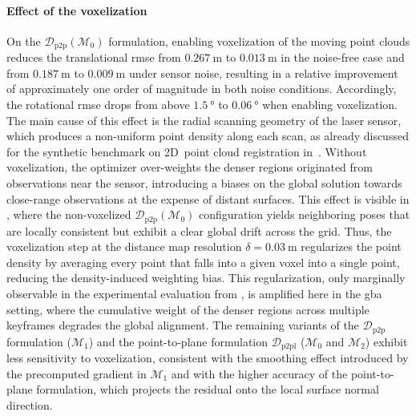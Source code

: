 \paragraph{Effect of the voxelization}
On the $\mathcal{D}_{\mathrm{p2p}}(\mathcal{M}_0)$ formulation,
enabling voxelization of the moving point clouds reduces the
translational \gls{rmse} from $\SI{0.267}{\metre}$ to
$\SI{0.013}{\metre}$ in the noise-free case and from
$\SI{0.187}{\metre}$ to $\SI{0.009}{\metre}$ under sensor noise, resulting in a
relative improvement of approximately one order of magnitude in both
noise conditions. Accordingly, the rotational \gls{rmse} drops from
above $\SI{1.5}{\degree}$ to $\SI{0.06}{\degree}$ when enabling voxelization.
The main cause of this effect is the radial scanning geometry of the
laser sensor, which produces a non-uniform point density along each
scan, as already discussed for the synthetic benchmark on 2D~point cloud
registration in~.
Without voxelization, the optimizer over-weights the denser regions
originated from observations near the sensor, introducing a biases on the global
solution towards close-range observations at the expense of distant surfaces.
This effect is visible in , where the
non-voxelized $\mathcal{D}_{\mathrm{p2p}}(\mathcal{M}_0)$
configuration yields neighboring poses that are locally consistent
but exhibit a clear global drift across the grid. Thus, the voxelization
step at the distance map resolution $\delta = \SI{0.03}{\metre}$
regularizes the point density by averaging every point that falls into a
given voxel into a single point, reducing the density-induced weighting bias.
This regularization, only marginally observable in the experimental evaluation
from , is amplified here in the \gls{gba} setting,
where the cumulative weight of the denser regions across multiple keyframes
degrades the global alignment. The remaining variants of the
$\mathcal{D}_{\mathrm{p2p}}$ formulation ($\mathcal{M}_1$) and the
point-to-plane formulation $\mathcal{D}_{\mathrm{p2pl}}$
($\mathcal{M}_0$ and $\mathcal{M}_2$) exhibit less
sensitivity to voxelization, consistent with the smoothing effect
introduced by the precomputed gradient in $\mathcal{M}_1$ and with
the higher accuracy of the point-to-plane formulation,
which projects the residual onto the local surface normal direction.

